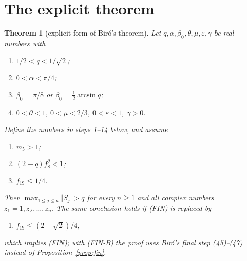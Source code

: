 \documentclass[11pt]{amsart}
\newtheorem{theorem}{Theorem}[section]
\theoremstyle{remark}
\theoremstyle{plain}
\newcommand{\abs}[1]{\lvert #1\rvert}
\newcommand{\eps}{\varepsilon}
\begin{document}
\section{The explicit theorem}\label{sec:explicit}

\begin{theorem}[explicit form of Bir\'o's theorem]\label{thm:explicit}
Let $q,\alpha,\beta_0,\theta,\mu,\eps,\gamma$ be real numbers with
\begin{enumerate}[label=\textup{(P\arabic*)},leftmargin=*]
\item $1/2<q<1/\sqrt2$;
\item $0<\alpha<\pi/4$;
\item $\beta_0=\pi/8$ or $\beta_0=\tfrac12\arcsin q$;
\item $0<\theta<1$, $0<\mu<2/3$, $0<\eps<1$, $\gamma>0$.
\end{enumerate}
Define the numbers in steps 1--14 below, and assume
\begin{enumerate}[label=\textup{(\arabic*)},leftmargin=*]
\item[\textup{(L8a)}] $m_5>1$;
\item[\textup{(L8b)}] $(2+q)f_8^{\theta}<1$;
\item[\textup{(FIN)}] $f_{19}\le1/4$.
\end{enumerate}
Then $\max_{1\le j\le n}\abs{S_j}>q$ for every $n\ge1$ and all complex numbers $z_1=1,z_2,\dots,z_n$. The same conclusion holds if \textup{(FIN)} is replaced by
\begin{enumerate}[label=\textup{(\arabic*)},leftmargin=*]
\item[\textup{(FIN-B)}] $f_{19}\le(2-\sqrt2)/4$,
\end{enumerate}
which implies \textup{(FIN)}; with \textup{(FIN-B)} the proof uses Bir\'o's final step \textup{(45)--(47)} instead of Proposition~\ref{prop:fin}.
\end{theorem}
\end{document}
